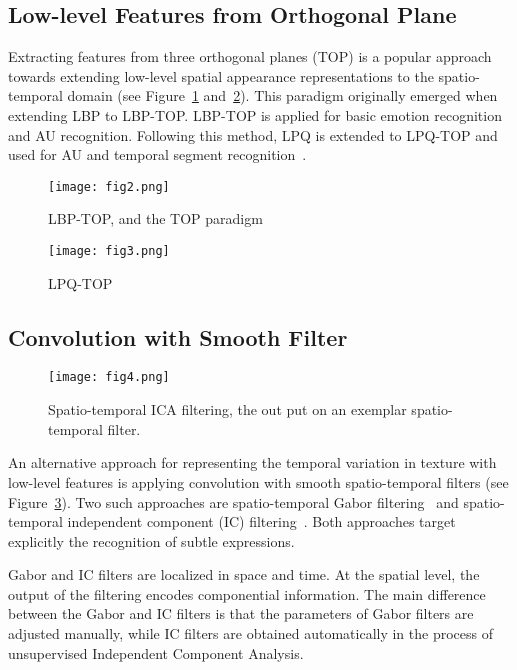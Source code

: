\documentclass[10pt,twocolumn,letterpaper]{article}
\begin{document}
	\subsection*{Low-level Features from Orthogonal Plane}
	Extracting features from three orthogonal planes (TOP) is a popular approach towards extending low-level spatial appearance representations to the spatio-temporal domain (see Figure~\ref{fig2} and~\ref{fig3}). This paradigm originally emerged when extending LBP to LBP-TOP. LBP-TOP is applied for basic emotion recognition~\cite{ZHAO20091117,Zhao2007Dynamic} and AU recognition. Following this method, LPQ is extended to LPQ-TOP and used for AU and temporal segment recognition~\cite{Jiang2011,Jiang2014}.
	\begin{figure}[h]
		\centering
		\texttt{[image: fig2.png]}
		\caption{LBP-TOP, and the TOP paradigm} \label{fig2}
	\end{figure}
	\begin{figure}[h]
	\centering
	\texttt{[image: fig3.png]}
	\caption{LPQ-TOP} \label{fig3}
	\end{figure}
	\subsection*{Convolution with Smooth Filter}
	\begin{figure}[h]
		\centering
		\texttt{[image: fig4.png]}
		\caption{Spatio-temporal ICA filtering, the out put on an exemplar spatio-temporal filter.} \label{fig4}
	\end{figure}
	\par
	An alternative approach for representing the temporal variation in texture with low-level features is applying convolution with smooth spatio-temporal filters (see Figure~\ref{fig4}). Two such approaches are spatio-temporal Gabor filtering~\cite{Wu2010} and spatio-temporal independent component (IC) filtering~\cite{LONG2012126}. Both approaches target explicitly the recognition of subtle expressions.
	\par
	Gabor and IC filters are localized in space and time. At the spatial level, the output of the filtering encodes componential information. The main difference between the Gabor and IC filters is that the parameters of Gabor filters are adjusted manually, while IC filters are obtained automatically in the process of unsupervised Independent Component Analysis.
\end{document}
